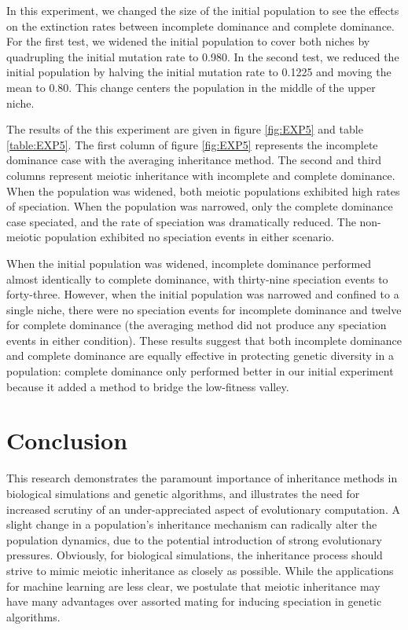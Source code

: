 \documentclass[conference]{IEEEtran}
\begin{document}
In this experiment, we changed the size of the initial population to see the effects on the extinction rates between incomplete dominance and complete dominance. For the first test, we widened the initial population to cover both niches by quadrupling the initial mutation rate to 0.980. In the second test, we reduced the initial population by halving the initial mutation rate to 0.1225 and moving the mean to 0.80. This change centers the population in the middle of the upper niche.

The results of the this experiment are given in figure \ref{fig:EXP5} and table \ref{table:EXP5}. The first column of figure \ref{fig:EXP5} represents the incomplete dominance case with the averaging inheritance method. The second and third columns represent meiotic inheritance with incomplete and complete dominance. When the population was widened, both meiotic populations exhibited high rates of speciation. When the population was narrowed, only the complete dominance case speciated, and the rate of speciation was dramatically reduced. The non-meiotic population exhibited no speciation events in either scenario. 

When the initial population was widened, incomplete dominance performed almost identically to complete dominance, with thirty-nine speciation events to forty-three. However, when the initial population was narrowed and confined to a single niche, there were no speciation events for incomplete dominance and twelve for complete dominance (the averaging method did not produce any speciation events in either condition). These results suggest that both incomplete dominance and complete dominance are equally effective in protecting genetic diversity in a population: complete dominance only performed better in our initial experiment because it added a method to bridge the low-fitness valley.



\section{Conclusion}

This research demonstrates the paramount importance of inheritance methods in biological simulations and genetic algorithms, and illustrates the need for increased scrutiny of an under-appreciated aspect of evolutionary computation. A slight change in a population’s inheritance mechanism can radically alter the population dynamics, due to the potential introduction of strong evolutionary pressures. Obviously, for biological simulations, the inheritance process should strive to mimic meiotic inheritance as closely as possible. While the applications for machine learning are less clear, we postulate that meiotic inheritance may have many advantages over assorted mating for inducing speciation in genetic algorithms.
\end{document}
